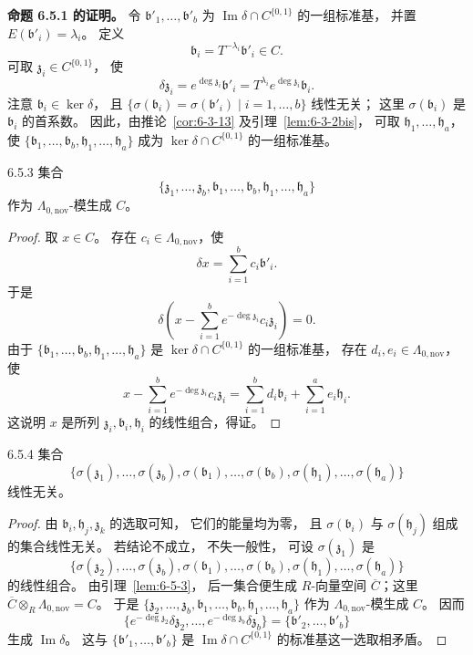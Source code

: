 \noindent\textbf{命题 6.5.1 的证明。}
令
$\mathfrak b'_1,\ldots,\mathfrak b'_b$
为 $\operatorname{Im}\delta\cap C^{\{0,1\}}$
的一组标准基，
并置 $E(\mathfrak b'_i)=\lambda_i$。
定义
\[
\mathfrak b_i=T^{-\lambda_i}\mathfrak b'_i\in C.
\]
可取 $\mathfrak z_i\in C^{\{0,1\}}$，
使
\[
\delta\mathfrak z_i
=e^{\deg\mathfrak z_i}\mathfrak b'_i
=T^{\lambda_i}e^{\deg\mathfrak z_i}\mathfrak b_i.
\]
注意 $\mathfrak b_i\in\ker\delta$，
且
$\{\sigma(\mathfrak b_i)
=\sigma(\mathfrak b'_i)\mid i=1,\ldots,b\}$
线性无关；
这里 $\sigma(\mathfrak b_i)$
是 $\mathfrak b_i$ 的首系数。
因此，由推论~\ref{cor:6-3-13}
及引理~\ref{lem:6-3-2bis}，
可取 $\mathfrak h_1,\ldots,\mathfrak h_a$，
使
$\{\mathfrak b_1,\ldots,\mathfrak b_b,
\mathfrak h_1,\ldots,\mathfrak h_a\}$
成为 $\ker\delta\cap C^{\{0,1\}}$
的一组标准基。

\begin{lemma}{6.5.3}\label{lem:6-5-3}
集合
\[
\{\mathfrak z_1,\ldots,\mathfrak z_b,
\mathfrak b_1,\ldots,\mathfrak b_b,
\mathfrak h_1,\ldots,\mathfrak h_a\}
\]
作为 $\Lambda_{0,\mathrm{nov}}$-模生成 $C$。
\end{lemma}

\begin{proof}
取 $x\in C$。
存在 $c_i\in\Lambda_{0,\mathrm{nov}}$，使
\[
\delta x=\sum_{i=1}^b c_i\mathfrak b'_i.
\]
于是
\[
\delta\left(
x-\sum_{i=1}^b
e^{-\deg\mathfrak z_i}c_i\mathfrak z_i
\right)=0.
\]
由于
$\{\mathfrak b_1,\ldots,\mathfrak b_b,
\mathfrak h_1,\ldots,\mathfrak h_a\}$
是 $\ker\delta\cap C^{\{0,1\}}$
的一组标准基，
存在 $d_i,e_i\in\Lambda_{0,\mathrm{nov}}$，
使
\[
x-\sum_{i=1}^b
e^{-\deg\mathfrak z_i}c_i\mathfrak z_i
=\sum_{i=1}^b d_i\mathfrak b_i
+\sum_{i=1}^a e_i\mathfrak h_i.
\]
这说明 $x$ 是所列
$\mathfrak z_i,\mathfrak b_i,\mathfrak h_i$
的线性组合，得证。
\end{proof}

\begin{lemma}{6.5.4}\label{lem:6-5-4}
集合
\[
\{\sigma(\mathfrak z_1),\ldots,\sigma(\mathfrak z_b),
\sigma(\mathfrak b_1),\ldots,\sigma(\mathfrak b_b),
\sigma(\mathfrak h_1),\ldots,\sigma(\mathfrak h_a)\}
\]
线性无关。
\end{lemma}

\begin{proof}
由 $\mathfrak b_i,\mathfrak h_j,\mathfrak z_k$
的选取可知，
它们的能量均为零，
且 $\sigma(\mathfrak b_i)$
与 $\sigma(\mathfrak h_j)$
组成的集合线性无关。
若结论不成立，
不失一般性，
可设 $\sigma(\mathfrak z_1)$
是
\[
\{\sigma(\mathfrak z_2),\ldots,
\sigma(\mathfrak z_b),
\sigma(\mathfrak b_1),\ldots,
\sigma(\mathfrak b_b),
\sigma(\mathfrak h_1),\ldots,
\sigma(\mathfrak h_a)\}
\]
的线性组合。
由引理~\ref{lem:6-5-3}，
后一集合便生成 $R$-向量空间
$\overline C$；这里
$\overline C\otimes_R\Lambda_{0,\mathrm{nov}}=C$。
于是
$\{\mathfrak z_2,\ldots,\mathfrak z_b,
\mathfrak b_1,\ldots,\mathfrak b_b,
\mathfrak h_1,\ldots,\mathfrak h_a\}$
作为 $\Lambda_{0,\mathrm{nov}}$-模生成 $C$。
因而
\[
\{e^{-\deg\mathfrak z_2}\delta\mathfrak z_2,
\ldots,
e^{-\deg\mathfrak z_b}\delta\mathfrak z_b\}
=\{\mathfrak b'_2,\ldots,\mathfrak b'_b\}
\]
生成 $\operatorname{Im}\delta$。
这与
$\{\mathfrak b'_1,\ldots,\mathfrak b'_b\}$
是 $\operatorname{Im}\delta\cap C^{\{0,1\}}$
的标准基这一选取相矛盾。
\end{proof}

